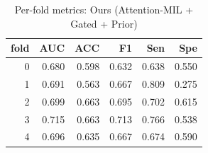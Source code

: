 \begin{table}[H]
\centering
\small
\caption{Per-fold metrics: Ours (Attention-MIL + Gated + Prior)}
\label{tab:ours_full_per_fold}
\begin{tabular}{rrrrrr}
\toprule
fold & AUC & ACC & F1 & Sen & Spe \\
\midrule
0 & 0.680 & 0.598 & 0.632 & 0.638 & 0.550 \\
1 & 0.691 & 0.563 & 0.667 & 0.809 & 0.275 \\
2 & 0.699 & 0.663 & 0.695 & 0.702 & 0.615 \\
3 & 0.715 & 0.663 & 0.713 & 0.766 & 0.538 \\
4 & 0.696 & 0.635 & 0.667 & 0.674 & 0.590 \\
\bottomrule
\end{tabular}
\end{table}
